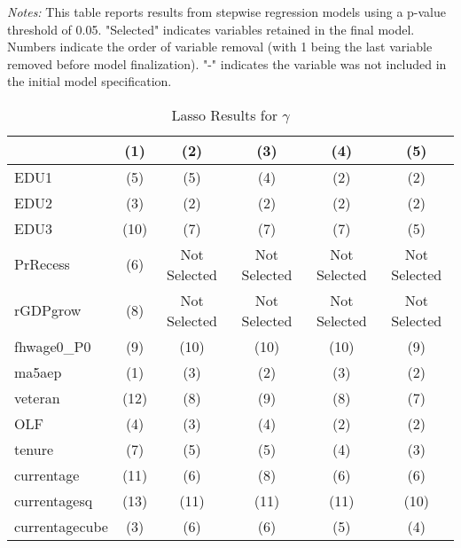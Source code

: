 \documentclass[12pt]{article}
\begin{document}
\begin{table}[H]
\begin{tabular}{lccccc}
\bottomrule
\end{tabular}%
\newline

\footnotesize
\textit{Notes:} This table reports results from stepwise regression models using a p-value threshold of 0.05. "Selected" indicates variables retained in the final model. Numbers indicate the order of variable removal (with 1 being the last variable removed before model finalization). "-" indicates the variable was not included in the initial model specification.

\end{table}





\begin{table}[H]
\centering
\caption{Lasso Results for $\gamma$}

\begin{tabular}{lccccc}

\toprule
                    & (1)     & (2)   & (3)    & (4)      & (5)         \\

\midrule
EDU1                &  (5)  &  (5)    &  (4)  &  (2)   &  (2)    \\
EDU2                &  (3)  &  (2)    &  (2)  &  (2)   &  (2)    \\
EDU3                &  (10)  &  (7)    &  (7)  &  (7)   &  (5)    \\
PrRecess            &  (6)   & Not Selected    & Not Selected   & Not Selected    & Not Selected     \\
rGDPgrow            &  (8)   & Not Selected     & Not Selected   & Not Selected    & Not Selected     \\
fhwage0\_P0         &  (9)   &  (10)     &  (10)   &  (10)    &  (9)     \\
ma5aep              &  (1)   &  (3)     &  (2)   &  (3)    &  (2)     \\
veteran             &  (12)   &  (8)     &  (9)   &  (8)    &  (7)     \\
OLF                 &  (4)   &  (3)     &  (4)   &  (2)    &  (2)     \\
tenure              &  (7)   &  (5)     &  (5)   &  (4)    &  (3)     \\
currentage          &  (11)   &  (6)     &  (8)   &  (6)    &  (6)     \\
currentagesq        &  (13)  &  (11)    &  (11)  &  (11)   &  (10)    \\
currentagecube      &  (3)  &  (6)    &  (6)  &  (5)   &  (4)    \\


\end{tabular}
\end{table}
\end{document}
